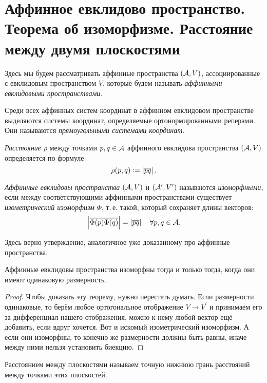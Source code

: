 \section{Аффинное евклидово пространство. Теорема об изоморфизме. Расстояние между двумя
плоскостями}

Здесь мы будем рассматривать аффинные пространства $(\mathcal{A}, V)$, ассоциированные с евклидовым пространством $V$, которые будем называть \textit{аффинными евклидовыми пространствами}.

Среди всех аффинных систем координат в аффинном евклидовом пространстве выделяются системы координат, определяемые ортонормированными реперами. Они называются \textit{прямоугольными системами координат}.

\begin{definition}
    \textit{Расстояние} $\rho$ между точками $p, q \in \mathcal{A}$ аффинного евклидова пространства $(\mathcal{A}, V)$ определяется по формуле
    \[
        \rho(p, q) \vcentcolon = \left\lvert\overline{pq}\right\rvert.
    \]
\end{definition}

\begin{definition}
    \textit{Аффинные евклидовы пространства} $(\mathcal{A}, V)$ и $(\mathcal{A}^\prime, V^\prime)$ называются \textit{изоморфными}, если между соответствующими аффинными пространствами существует \textit{изометрический изоморфизм} $\Phi$, т.\,е. такой, который сохраняет длины векторов:
    \[
        \left\lvert\overline{\Phi(p)\Phi(q)}\right\rvert = \left\lvert\overline{pq}\right\rvert\quad\forall p, q \in \mathcal{A}.
    \]
\end{definition}

Здесь верно утверждение, аналогичное уже доказанному про аффинные пространства.

\begin{theorem}[Об изоморфизме]
    Аффинные евклидовы пространства изоморфны тогда и только тогда, когда они имеют одинаковую размерность.
\end{theorem}

\begin{proof}
    Чтобы доказать эту теорему, нужно перестать думать. Если размерности одинаковые, то берём любое ортогональное отображение $V \to V^\prime$ и принимаем его за дифференциал нашего отображения, можно к нему любой вектор ещё добавить, если вдруг хочется. Вот и искомый изометрический изоморфизм. А если они изоморфны, то конечно же размерности должны быть равны, иначе между ними нельзя установить биекцию.
\end{proof}

\begin{definition}
    Расстоянием между плоскостями называем точную нижнюю грань расстояний между точками этих плоскостей.
\end{definition}

